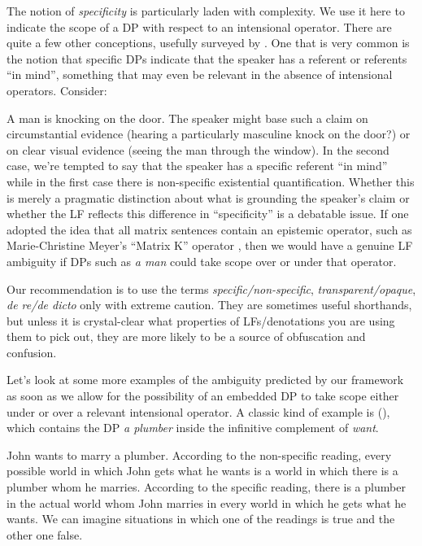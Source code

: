 The notion of \emph{specificity} is particularly laden with complexity. We use
it here to indicate the scope of a DP with respect to an intensional operator.
There are quite a few other conceptions, usefully surveyed by
\cite{heusinger-2011-specificity}. One that is very common is the notion that
specific DPs indicate that the speaker has a referent or referents ``in mind'',
something that may even be relevant in the absence of intensional operators.
Consider:

\ex
A man is knocking on the door.
\xe
%
The speaker might base such a claim on circumstantial evidence (hearing a
particularly masculine knock on the door?) or on clear visual evidence (seeing
the man through the window). In the second case, we're tempted to say that the
speaker has a specific referent ``in mind'' while in the first case there is
non-specific existential quantification. Whether this is merely a
pragmatic distinction about what is grounding the speaker's claim or whether the
LF reflects this difference in ``specificity'' is a debatable issue. If one
adopted the idea that all matrix sentences contain an epistemic operator, such
as Marie-Christine Meyer's ``Matrix K'' operator \parencite{meyer-2013-thesis},
then we would have a genuine LF ambiguity if DPs such as \emph{a man} could take
scope over or under that operator.

Our recommendation is to use the terms \emph{specific/non-specific},
\emph{transparent/opaque}, \emph{de re/de dicto} only with extreme caution. They
are sometimes useful shorthands, but unless it is crystal-clear what properties
of LFs/denotations you are using them to pick out, they are more likely to be a
source of obfuscation and confusion.

Let's look at some more examples of the ambiguity predicted by our framework as
soon as we allow for the possibility of an embedded DP to take scope either
under or over a relevant intensional operator. A classic kind of example is
(\nextx), which contains the DP \emph{a plumber} inside the infinitive
complement of \emph{want}.

\ex John wants to marry a plumber. \xe
%
According to the non-specific reading, every possible world in which John gets
what he wants is a world in which there is a plumber whom he marries. According
to the specific reading, there is a plumber in the actual world whom John
marries in every world in which he gets what he wants. We can imagine situations
in which one of the readings is true and the other one false.

